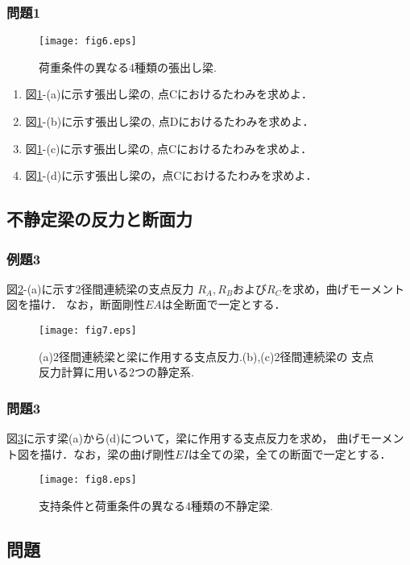 ﻿\documentclass[10pt,a4j]{jarticle}
\begin{document}
\subsubsection{問題1}
\begin{figure}
	\begin{center}
	\texttt{[image: fig6.eps]} 
	\end{center}
	\caption{荷重条件の異なる4種類の張出し梁.} 
	\label{fig:fig2_6}
\end{figure}
\begin{enumerate}
\item
	図\ref{fig:fig2_6}-(a)に示す張出し梁の, 点Cにおけるたわみを求めよ．
\item
	図\ref{fig:fig2_6}-(b)に示す張出し梁の, 点Dにおけるたわみを求めよ．
\item
	図\ref{fig:fig2_6}-(c)に示す張出し梁の, 点Cにおけるたわみを求めよ．
\item
	図\ref{fig:fig2_6}-(d)に示す張出し梁の，点Cにおけるたわみを求めよ．
\end{enumerate}
\subsection{不静定梁の反力と断面力}
\subsubsection{例題3}
図\ref{fig:fig2_7}-(a)に示す2径間連続梁の支点反力
$R_A, R_B$および$R_C$を求め，曲げモーメント図を描け．
なお，断面剛性$EA$は全断面で一定とする．
\begin{figure}
	\begin{center}
	\texttt{[image: fig7.eps]} 
	\end{center}
	\caption{(a)2径間連続梁と梁に作用する支点反力.(b),(c)2径間連続梁の
	支点反力計算に用いる2つの静定系.} 
	\label{fig:fig2_7}
\end{figure}
\subsubsection{問題3}
図\ref{fig:fig2_8}に示す梁(a)から(d)について，梁に作用する支点反力を求め，
曲げモーメント図を描け．なお，梁の曲げ剛性$EI$は全ての梁，全ての断面で一定とする．
\begin{figure}
	\begin{center}
	\texttt{[image: fig8.eps]} 
	\end{center}
	\caption{支持条件と荷重条件の異なる4種類の不静定梁.} 
	\label{fig:fig2_8}
\end{figure}
\subsection{問題}
\end{document}
